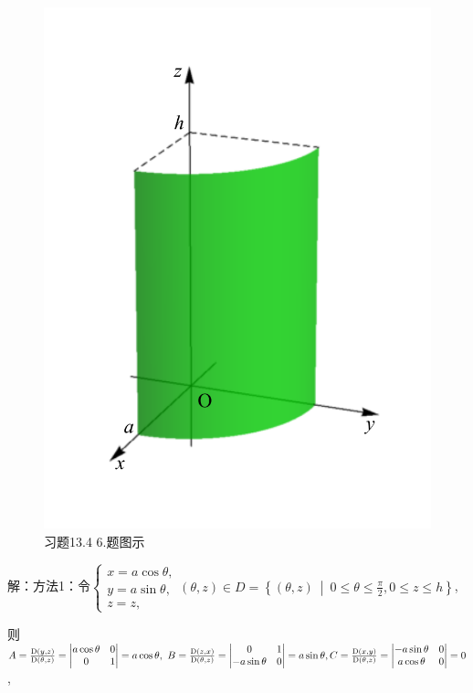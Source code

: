 \documentclass[12pt,UTF8,fleqn]{ctexart}
\newcommand\Set[2]{\left\{#1\ \middle\vert\ #2 \right\}}
\begin{document}
\begin{enumerate}
\begin{figure}[H]
\begin{center}
\includegraphics[height=0.5\textheight]{Figures23/Fig13-4-6.pdf}
\end{center}
\caption{习题13.4 6.题图示}
\label{13-4-6}
\end{figure}

解：方法1：令$\begin{cases}
x=a\cos\theta,\\
y=a\sin\theta,\\
z=z,
\end{cases}(\theta,z)\in D=\Set{(\theta,z)}{0\leqslant\theta\leqslant\frac\pi2,0\leqslant z\leqslant h}$,

则$A=\frac{\mathrm D(y,z)}{\mathrm D(\theta,z)}=\begin{vmatrix}
a\cos\theta&0\\
0&1
\end{vmatrix}=a\cos\theta,\ B=\frac{\mathrm D(z,x)}{\mathrm D(\theta,z)}=\begin{vmatrix}
0&1\\
-a\sin\theta&0
\end{vmatrix}=a\sin\theta,\\
C=\frac{\mathrm D(x,y)}{\mathrm D(\theta,z)}=\begin{vmatrix}
-a\sin\theta&0\\
a\cos\theta&0
\end{vmatrix}=0$,


\end{enumerate}
\end{document}
